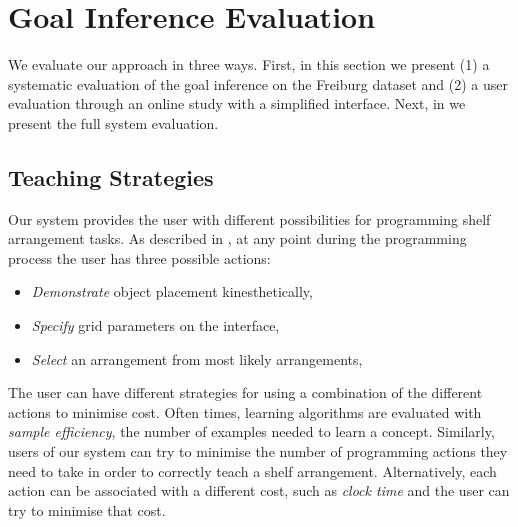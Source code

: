 
\section{Goal Inference Evaluation}\label{sec:irosinfeval}
We evaluate our approach in three ways.
First, in this section we present (1) a systematic evaluation of the goal inference on the Freiburg dataset and (2) a user evaluation through an online study with a simplified interface. Next, in  we present the full system evaluation.


\subsection{Teaching Strategies}
\label{sec:irosstrategies}

Our system provides the user with different possibilities for programming shelf arrangement tasks. 
As described in , at any point during the programming process the user has three possible actions:
\begin{itemize}
	\item \textit{Demonstrate} object placement kinesthetically, %
	\item \textit{Specify} grid parameters on the interface, %
	\item \textit{Select} an arrangement from most likely arrangements, %
\end{itemize}

The user can have different strategies for using a combination of the different actions to minimise cost.
Often times, learning algorithms are evaluated with {\em sample efficiency}, \ie the number of examples needed to learn a concept.
Similarly, users of our system can try to minimise the number of programming actions they need to take in order to correctly teach a shelf arrangement.
Alternatively, each action can be associated with a different cost, such as {\em clock time} and the user can try to minimise that cost.

